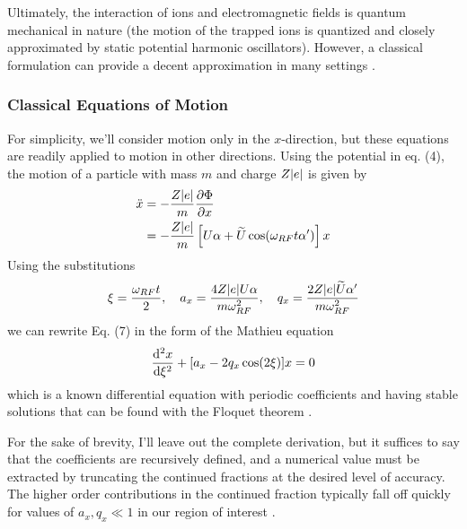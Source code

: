 Ultimately, the interaction of ions and electromagnetic fields is quantum mechanical in nature (the motion of the trapped ions is quantized and closely approximated by static potential harmonic oscillators). However, a classical formulation can provide a decent approximation in many settings \cite{Leibfried}.
\subsubsection{Classical Equations of Motion}
For simplicity, we'll consider motion only in the $x$-direction, but these equations are readily applied to motion in other directions. Using the potential in eq. (4), the motion of a particle with mass $m$ and charge $Z\abs{e}$ is given by
\begin{align}
    \ddot{x} &= -\frac{Z\abs{e}}{m} \partialderivative{\Phi}{x}\\
    \nonumber&= -\frac{Z\abs{e}}{m} \left[ U\alpha + \widetilde{U} \cos(\omega_{RF} t \alpha')\right] x
\end{align}
Using the substitutions
\begin{equation}
    \xi = \frac{\omega_{RF} t}{2}, \quad a_x = \frac{4Z\abs{e} U\alpha}{m \omega_{RF}^2}, \quad q_x = \frac{2 Z\abs{e} \widetilde{U}\alpha'}{m \omega_{RF}^2}
\end{equation}
we can rewrite Eq. (7) in the form of the Mathieu equation
\begin{equation}
    \derivative{^2 x}{\xi^2} + [a_x - 2q_x \cos(2\xi)] x = 0
\end{equation}
which is a known differential equation with periodic coefficients and having stable solutions that can be found with the Floquet theorem \cite{Leibfried}. 

For the sake of brevity, I'll leave out the complete derivation, but it suffices to say that the coefficients are recursively defined, and a numerical value must be extracted by truncating the continued fractions at the desired level of accuracy. The higher order contributions in the continued fraction typically fall off quickly for values of $a_x, q_x \ll 1$ in our region of interest \cite{Leibfried}.

